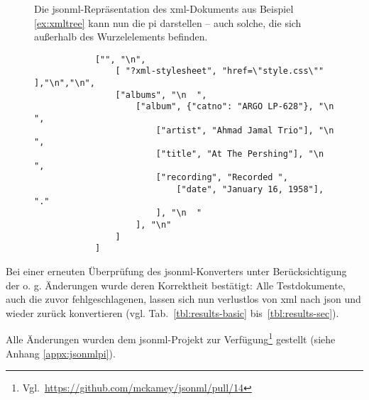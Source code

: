 \begin{figure}[h!]

    \begin{example}
        Die \acrshort{jsonml}-Repräsentation des \acrshort{xml}-Dokuments aus Beispiel \ref{ex:xmltree} kann nun die \gls{pi} darstellen -- auch solche, die sich außerhalb des Wurzelelements befinden.
        \begin{verbatim}
            ["", "\n",
                [ "?xml-stylesheet", "href=\"style.css\"" ],"\n","\n",
                ["albums", "\n  ",
                    ["album", {"catno": "ARGO LP-628"}, "\n    ",
                        ["artist", "Ahmad Jamal Trio"], "\n    ",
                        ["title", "At The Pershing"], "\n    ",
                        ["recording", "Recorded ",
                            ["date", "January 16, 1958"], "."
                        ], "\n  "
                    ], "\n"
                ]
            ]
        \end{verbatim}
    \end{example}
\end{figure}

Bei einer erneuten Überprüfung des \acrshort{jsonml}-Konverters unter Berücksichtigung der o. g. Änderungen wurde deren Korrektheit bestätigt: Alle Testdokumente, auch die zuvor fehlgeschlagenen, lassen sich nun verlustlos von \acrshort{xml} nach \acrshort{json} und wieder zurück konvertieren (vgl. Tab.~\ref{tbl:results-basic} bis~\ref{tbl:results-sec}).

Alle Änderungen wurden dem \acrshort{jsonml}-Projekt zur Verfügung\footnote{Vgl.~\url{https://github.com/mckamey/jsonml/pull/14}} gestellt (siehe Anhang \ref{appx:jsonmlpi}).
